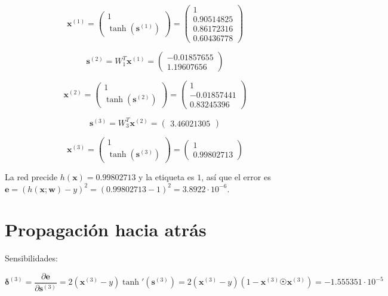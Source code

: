 \documentclass{article}
\begin{document}
\[\textbf{x}^{(1)}=\begin{pmatrix}1 \\
    \tanh(\textbf{s}^{(1)})\end{pmatrix}=\begin{pmatrix} 1 \\ 0.90514825 \\
    0.86172316 \\ 0.60436778
  \end{pmatrix}\]

\[\textbf{s}^{(2)}=W_1^T\textbf{x}^{(1)}=\begin{pmatrix}
    -0.01857655 \\ 1.19607656
  \end{pmatrix}\]

\[\textbf{x}^{(2)}=\begin{pmatrix}1 \\
    \tanh(\textbf{s}^{(2)})\end{pmatrix}=\begin{pmatrix} 1 \\ -0.01857441 \\
   0.83245396
 \end{pmatrix}\]

\[\textbf{s}^{(3)}=W_3^T\textbf{x}^{(2)}=\begin{pmatrix}
    3.46021305
  \end{pmatrix}\]

\[\textbf{x}^{(3)}=\begin{pmatrix}1 \\
    \tanh(\textbf{s}^{(3)})\end{pmatrix}=\begin{pmatrix} 1 \\ 0.99802713
  \end{pmatrix}\]

La red precide $h(\textbf{x})=0.99802713$ y la etiqueta es $1$, así
que el error es $\textbf{e}=(h(\textbf{x};\textbf{w})-y)^2=(0.99802713-1)^2=3.8922\cdot 10^{-6}$.

\section{Propagación hacia atrás}

Sensibilidades:

\[\boldsymbol{\delta}^{(3)}=\frac{\partial\textbf{e}}{\partial\textbf{s}^{(3)}}=2(\textbf{x}^{(3)}-y)\tanh'(\textbf{s}^{(3)})=2(\textbf{x}^{(3)}-y)(1-\textbf{x}^{(3)}\astrosun\textbf{x}^{(3)})=-1.555351\cdot 10^{-5}\]
\end{document}
